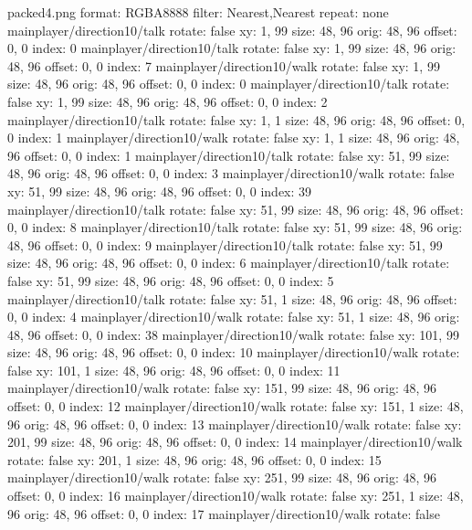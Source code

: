 packed4.png
format: RGBA8888
filter: Nearest,Nearest
repeat: none
mainplayer/direction10/talk
  rotate: false
  xy: 1, 99
  size: 48, 96
  orig: 48, 96
  offset: 0, 0
  index: 0
mainplayer/direction10/talk
  rotate: false
  xy: 1, 99
  size: 48, 96
  orig: 48, 96
  offset: 0, 0
  index: 7
mainplayer/direction10/walk
  rotate: false
  xy: 1, 99
  size: 48, 96
  orig: 48, 96
  offset: 0, 0
  index: 0
mainplayer/direction10/talk
  rotate: false
  xy: 1, 99
  size: 48, 96
  orig: 48, 96
  offset: 0, 0
  index: 2
mainplayer/direction10/talk
  rotate: false
  xy: 1, 1
  size: 48, 96
  orig: 48, 96
  offset: 0, 0
  index: 1
mainplayer/direction10/walk
  rotate: false
  xy: 1, 1
  size: 48, 96
  orig: 48, 96
  offset: 0, 0
  index: 1
mainplayer/direction10/talk
  rotate: false
  xy: 51, 99
  size: 48, 96
  orig: 48, 96
  offset: 0, 0
  index: 3
mainplayer/direction10/walk
  rotate: false
  xy: 51, 99
  size: 48, 96
  orig: 48, 96
  offset: 0, 0
  index: 39
mainplayer/direction10/talk
  rotate: false
  xy: 51, 99
  size: 48, 96
  orig: 48, 96
  offset: 0, 0
  index: 8
mainplayer/direction10/talk
  rotate: false
  xy: 51, 99
  size: 48, 96
  orig: 48, 96
  offset: 0, 0
  index: 9
mainplayer/direction10/talk
  rotate: false
  xy: 51, 99
  size: 48, 96
  orig: 48, 96
  offset: 0, 0
  index: 6
mainplayer/direction10/talk
  rotate: false
  xy: 51, 99
  size: 48, 96
  orig: 48, 96
  offset: 0, 0
  index: 5
mainplayer/direction10/talk
  rotate: false
  xy: 51, 1
  size: 48, 96
  orig: 48, 96
  offset: 0, 0
  index: 4
mainplayer/direction10/walk
  rotate: false
  xy: 51, 1
  size: 48, 96
  orig: 48, 96
  offset: 0, 0
  index: 38
mainplayer/direction10/walk
  rotate: false
  xy: 101, 99
  size: 48, 96
  orig: 48, 96
  offset: 0, 0
  index: 10
mainplayer/direction10/walk
  rotate: false
  xy: 101, 1
  size: 48, 96
  orig: 48, 96
  offset: 0, 0
  index: 11
mainplayer/direction10/walk
  rotate: false
  xy: 151, 99
  size: 48, 96
  orig: 48, 96
  offset: 0, 0
  index: 12
mainplayer/direction10/walk
  rotate: false
  xy: 151, 1
  size: 48, 96
  orig: 48, 96
  offset: 0, 0
  index: 13
mainplayer/direction10/walk
  rotate: false
  xy: 201, 99
  size: 48, 96
  orig: 48, 96
  offset: 0, 0
  index: 14
mainplayer/direction10/walk
  rotate: false
  xy: 201, 1
  size: 48, 96
  orig: 48, 96
  offset: 0, 0
  index: 15
mainplayer/direction10/walk
  rotate: false
  xy: 251, 99
  size: 48, 96
  orig: 48, 96
  offset: 0, 0
  index: 16
mainplayer/direction10/walk
  rotate: false
  xy: 251, 1
  size: 48, 96
  orig: 48, 96
  offset: 0, 0
  index: 17
mainplayer/direction10/walk
  rotate: false

